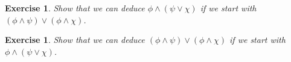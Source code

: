 \documentclass{article}
\theoremstyle{plain}
\newtheorem{Q}[theorem]{Exercise}{\bfseries}{\upshape}
\begin{document}
\begin{Q}
Show that we can deduce $\phi\wedge(\psi\vee\chi)$ if we start with $(\phi\wedge \psi)\vee (\phi\wedge \chi)$.
\end{Q}
\begin{comment}
\textbf{Solution:}
To save space let $\theta =(\phi\wedge \psi)\vee (\phi\wedge \chi)$.
\begin{prooftree}
\AxiomC{$\theta$}
\AxiomC{$[\phi\wedge\psi]$}
\LeftLabel{ $\color{red}(\wedge_{E_l})$}
\UnaryInfC{$\phi$}
\AxiomC{$[\phi\wedge\chi]$}
\RightLabel{ $\color{red}(\wedge_{E_l})$}
\UnaryInfC{$\phi$}
\LeftLabel{ $\color{red}(\vee_E)$}
\TrinaryInfC{$\phi$}

\AxiomC{$\theta$}
\AxiomC{$[\phi\wedge\psi]$}
\LeftLabel{ $\color{red}(\wedge_{E_r})$}
\UnaryInfC{$\psi$}
\LeftLabel{ $\color{red}(\vee_{I_l})$}
\UnaryInfC{$\psi\vee\chi$}
\AxiomC{$[\phi\wedge\chi]$}
\RightLabel{ $\color{red}(\wedge_{E_r})$}
\UnaryInfC{$\chi$}
\RightLabel{ $\color{red}(\vee_{I_r})$}
\UnaryInfC{$\psi\vee\chi$}
\RightLabel{ $\color{red}(\vee_E)$}
\TrinaryInfC{$\psi\vee\chi$}
\LeftLabel{ $\color{red}(\wedge_I)$}
\BinaryInfC{$\phi\wedge(\psi\vee\chi)$}
\end{prooftree}
\end{comment}

\begin{Q}
Show that we can deduce $(\phi\wedge \psi)\vee (\phi\wedge \chi)$ if we start with $\phi\wedge(\psi\vee\chi)$.
\end{Q}
\begin{comment}
\textbf{Solution:}
\begin{prooftree}

\AxiomC{$\phi\wedge (\psi\vee \chi)$}
\LeftLabel{ $\color{red}(\wedge_{E_r})$}
\UnaryInfC{$\psi\vee \chi$}

\AxiomC{$\phi\wedge (\psi\vee \chi)$}
\LeftLabel{ $\color{red}(\wedge_{E_l})$}
\UnaryInfC{$\phi$}

\AxiomC{$[\psi]_1$}
\UnaryInfC{$\psi$}
\LeftLabel{ $\color{red}(\wedge_I)$}
\BinaryInfC{$\phi\wedge\psi$}
\LeftLabel{ $\color{red}(\vee_{I_l})$}
\UnaryInfC{$(\phi\wedge\psi)\vee(\phi\wedge\chi)$}

\AxiomC{$\phi\wedge (\psi\vee \chi)$}
\RightLabel{ $\color{red}(\wedge_{E_l})$}
\UnaryInfC{$\phi$}

\AxiomC{$[\chi]_1$}
\UnaryInfC{$\chi$}
\RightLabel{ $\color{red}(\wedge_I)$}
\BinaryInfC{$\phi\wedge\chi$}
\RightLabel{ $\color{red}(\vee_{I_r})$}
\UnaryInfC{$(\phi\wedge\psi)\vee(\phi\wedge\chi)$}


\LeftLabel{ $\color{red}(\vee_E)$}
\TrinaryInfC{$(\phi\wedge\psi)\vee(\phi\wedge\chi)$}

\end{prooftree}
\end{comment}
\end{document}
